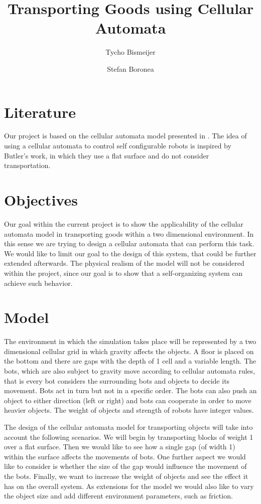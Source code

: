 \documentclass{article}
\title{Transporting Goods using Cellular Automata}
\author{Tycho Bismeijer \and Stefan Boronea}
\date{}
\begin{document}
\maketitle

\section{Literature}
Our project is based on the cellular automata model presented in \cite{1013457}. The idea of using a cellular automata to control self configurable robots is inspired by Butler's work, in which they use a flat surface and do not consider transportation.

\section{Objectives}
Our goal within the current project is to show the applicability of the cellular automata model in transporting goods within a two dimensional environment. In this sense we are trying to design a cellular automata that can perform this task. We would like to limit our goal to the design of this system, that could be further extended afterwards. The physical realism of the model will not be considered within the project, since our goal is to show that a self-organizing system can achieve such behavior.

\section{Model}
The environment in which the simulation takes place will be represented by a two dimensional cellular grid in which gravity affects the objects. A floor is placed on the bottom and there are gaps with the depth of 1 cell and a variable length. The bots, which are also subject to gravity move according to cellular automata rules, that is every bot considers the surrounding bots and objects to decide its movement. Bots act in turn but not in a specific order. The bots can also push an object to either direction (left or right) and bots can cooperate in order to move heavier objects. The weight of objects and strength of robots have integer values.

The design of the cellular automata model for transporting objects will take into account the following scenarios. We will begin by transporting blocks of weight 1 over a flat surface. Then we would like to see how a single gap (of width 1) within the surface affects the movements of bots. One further aspect we would like to consider is whether the size of the gap would influence the movement of the bots. Finally, we want to increase the weight of objects and see the effect it has on the overall system. As extensions for the model we would also like to vary the object size and add different environment parameters, such as friction.
\end{document}
